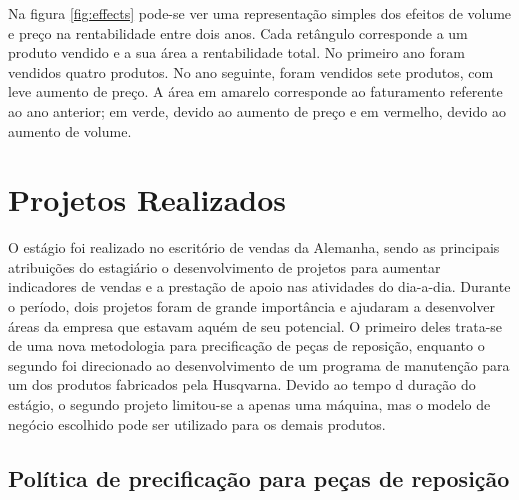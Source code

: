 \documentclass[12pt]{article}
\begin{document}
	Na figura \ref{fig:effects} pode-se ver uma representação simples dos efeitos de volume e preço na rentabilidade entre dois anos. Cada retângulo corresponde a um produto vendido e a sua área a rentabilidade total. No primeiro ano foram vendidos quatro produtos. No ano seguinte, foram vendidos sete produtos, com leve aumento de preço. A área em amarelo corresponde ao faturamento referente ao ano anterior; em verde, devido ao aumento de preço e em vermelho, devido ao aumento de volume.


\section{Projetos Realizados}

	O estágio foi realizado no escritório de vendas da Alemanha, sendo as principais atribuições do estagiário o desenvolvimento de projetos para aumentar indicadores de vendas e a prestação de apoio nas atividades do dia-a-dia. Durante o período, dois projetos foram de grande importância e ajudaram a desenvolver áreas da empresa que estavam aquém de seu potencial. O primeiro deles trata-se de uma nova metodologia para precificação de peças de reposição, enquanto o segundo foi direcionado ao desenvolvimento de um programa de manutenção para um dos produtos fabricados pela Husqvarna. Devido ao tempo d duração do estágio, o segundo projeto limitou-se a apenas uma máquina, mas o modelo de negócio escolhido pode ser utilizado para os demais produtos.

\subsection{Política de precificação para peças de reposição}
\end{document}
